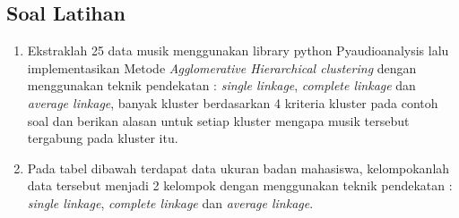 \subsection{Soal Latihan}
\begin{enumerate}
    \item Ekstraklah 25 data musik menggunakan library python Pyaudioanalysis lalu implementasikan Metode \textit{Agglomerative Hierarchical clustering} dengan menggunakan teknik pendekatan : \textit{single linkage}, \textit{complete linkage} dan \textit{ average linkage}, banyak kluster berdasarkan 4 kriteria kluster pada contoh soal dan berikan alasan untuk setiap kluster mengapa musik tersebut tergabung pada kluster itu.
    \item Pada tabel dibawah terdapat data ukuran badan mahasiswa, kelompokanlah data tersebut menjadi 2 kelompok dengan menggunakan teknik pendekatan : \textit{single linkage}, \textit{complete linkage} dan \textit{ average linkage}. 
\begin{table}[htbp]

\label{tab:my-table}
\end{table}
\end{enumerate}




